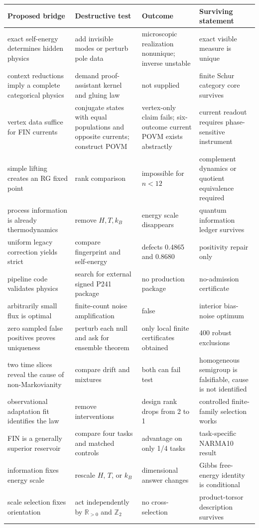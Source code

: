 \documentclass[11pt,a4paper,openany]{report}
\begin{document}
\begin{center}
\begingroup\small
\setlength{\tabcolsep}{2.5pt}
\renewcommand{\arraystretch}{1.16}
\begin{longtable}{@{}p{}p{}p{}p{}@{}}
\toprule
\textbf{Proposed bridge} & \textbf{Destructive test} & \textbf{Outcome} & \textbf{Surviving statement} \\
\midrule
\endhead
exact self-energy determines hidden physics & add invisible modes or perturb pole data & microscopic realization nonunique; inverse unstable & exact visible measure is unique \\
context reductions imply a complete categorical physics & demand proof-assistant kernel and gluing law & not supplied & finite Schur category core survives \\
vertex data suffice for FIN currents & conjugate states with equal populations and opposite currents; construct POVM & vertex-only claim fails; six-outcome current POVM exists abstractly & current readout requires phase-sensitive instrument \\
simple lifting creates an RG fixed point & rank comparison & impossible for \(n<12\) & complement dynamics or quotient equivalence required \\
process information is already thermodynamics & remove \(H,T,k_B\) & energy scale disappears & quantum information ledger survives \\
uniform legacy correction yields strict & compare fingerprint and self-energy & defects 0.4865 and 0.8680 & positivity repair only \\
pipeline code validates physics & search for external signed P241 package & no production package & no-admission certificate \\
arbitrarily small flux is optimal & finite-count noise amplification & false & interior bias-noise optimum \\
zero sampled false positives proves uniqueness & perturb each null and ask for ensemble theorem & only local finite certificates obtained & 400 robust exclusions \\
two time slices reveal the cause of non-Markovianity & compare drift and mixtures & both can fail test & homogeneous semigroup is falsifiable, cause is not identified \\
observational adaptation fit identifies the law & remove interventions & design rank drops from 2 to 1 & controlled finite-family selection works \\
FIN is a generally superior reservoir & compare four tasks and matched controls & advantage on only 1/\allowbreak{}4 tasks & task-specific NARMA10 result \\
information fixes energy scale & rescale \(H\), \(T\), or \(k_B\) & dimensional answer changes & Gibbs free-energy identity is conditional \\
scale selection fixes orientation & act independently by \(\mathbb R_{>0}\) and \(\mathbb Z_2\) & no cross-selection & product-torsor description survives \\
\bottomrule
\end{longtable}
\endgroup
\end{center}
\end{document}
